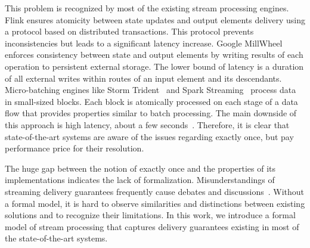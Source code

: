 

This problem is recognized by most of the existing stream processing engines. Flink ensures atomicity between state updates and output elements delivery using a protocol based on distributed transactions. This protocol prevents inconsistencies but leads to a significant latency increase. Google MillWheel~\cite{Akidau:2013:MFS:2536222.2536229} enforces consistency between state and output elements by writing results of each operation to persistent external storage. The lower bound of latency is a duration of all external writes within routes of an input element and its descendants. Micro-batching engines like Storm Trident~\cite{apache:storm:trident} and Spark Streaming~\cite{Zaharia:2012:DSE:2342763.2342773} process data in small-sized blocks. Each block is atomically processed on each stage of a data flow that provides properties similar to batch processing. The main downside of this approach is high latency, about a few seconds~\cite{7530084, 7474816}. Therefore, it is clear that state-of-the-art systems are aware of the issues regarding exactly once, but pay performance price for their resolution.

The huge gap between the notion of exactly once and the properties of its implementations indicates the lack of formalization. Misunderstandings of streaming delivery guarantees frequently cause debates and discussions~\cite{JerryPengStreamIO, PaperTrail}. Without a formal model, it is hard to observe similarities and distinctions between existing solutions and to recognize their limitations. In this work, we introduce a formal model of stream processing that captures delivery guarantees existing in most of the state-of-the-art systems.


